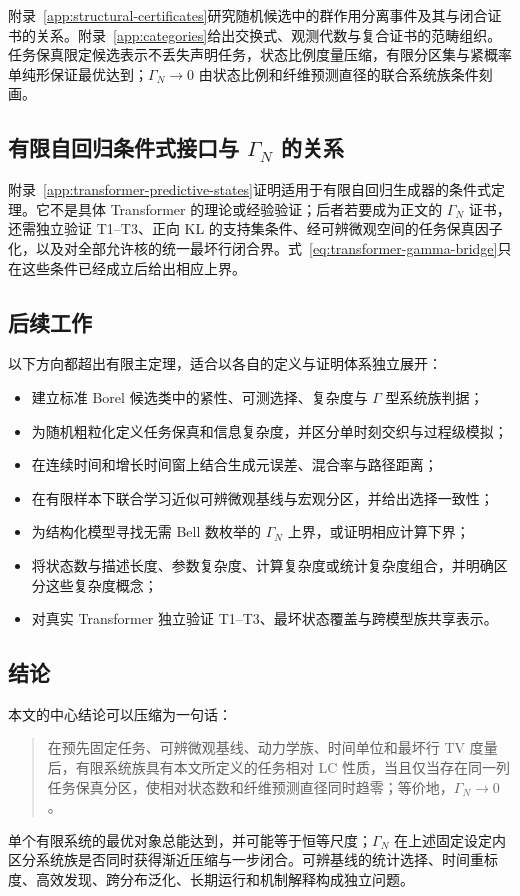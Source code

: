 附录~\ref{app:structural-certificates}研究随机候选中的群作用分离事件及其与闭合证书的关系。附录~\ref{app:categories}给出交换式、观测代数与复合证书的范畴组织。任务保真限定候选表示不丢失声明任务，状态比例度量压缩，有限分区集与紧概率单纯形保证最优达到；$\Gamma_N\to0$ 由状态比例和纤维预测直径的联合系统族条件刻画。

\subsection{有限自回归条件式接口与 \texorpdfstring{$\Gamma_N$}{Gamma-N} 的关系}

附录~\ref{app:transformer-predictive-states}证明适用于有限自回归生成器的条件式定理。它不是具体 Transformer 的理论或经验验证；后者若要成为正文的 $\Gamma_N$ 证书，还需独立验证 T1--T3、正向 KL 的支持集条件、经可辨微观空间的任务保真因子化，以及对全部允许核的统一最坏行闭合界。式~\eqref{eq:transformer-gamma-bridge}只在这些条件已经成立后给出相应上界。

\subsection{后续工作}

以下方向都超出有限主定理，适合以各自的定义与证明体系独立展开：

\begin{itemize}
  \item 建立标准 Borel 候选类中的紧性、可测选择、复杂度与 $\Gamma$ 型系统族判据；
  \item 为随机粗粒化定义任务保真和信息复杂度，并区分单时刻交织与过程级模拟；
  \item 在连续时间和增长时间窗上结合生成元误差、混合率与路径距离；
  \item 在有限样本下联合学习近似可辨微观基线与宏观分区，并给出选择一致性；
  \item 为结构化模型寻找无需 Bell 数枚举的 $\Gamma_N$ 上界，或证明相应计算下界；
  \item 将状态数与描述长度、参数复杂度、计算复杂度或统计复杂度组合，并明确区分这些复杂度概念；
  \item 对真实 Transformer 独立验证 T1--T3、最坏状态覆盖与跨模型族共享表示。
\end{itemize}

\subsection{结论}

本文的中心结论可以压缩为一句话：

\begin{quote}
在预先固定任务、可辨微观基线、动力学族、时间单位和最坏行 TV 度量后，有限系统族具有本文所定义的任务相对 LC 性质，当且仅当存在同一列任务保真分区，使相对状态数和纤维预测直径同时趋零；等价地，$\Gamma_N\to0$。
\end{quote}

单个有限系统的最优对象总能达到，并可能等于恒等尺度；$\Gamma_N$ 在上述固定设定内区分系统族是否同时获得渐近压缩与一步闭合。可辨基线的统计选择、时间重标度、高效发现、跨分布泛化、长期运行和机制解释构成独立问题。
